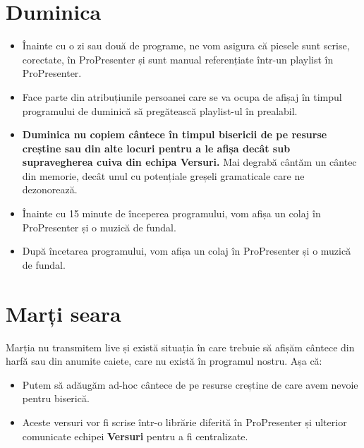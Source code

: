 \documentclass[epjST]{svjour}
\begin{document}
  \section{Duminica}
  \label{sec:3}
  \begin{itemize}
    \item Înainte cu o zi sau două de programe, ne vom asigura că piesele sunt
      scrise, corectate, în ProPresenter și sunt manual referențiate într-un
      playlist în ProPresenter.

    \item Face parte din atribuțiunile persoanei care se va ocupa de afișaj în timpul
      programului de duminică să pregătească playlist-ul în prealabil.

    \item \textbf{Duminica nu copiem cântece în timpul bisericii de pe resurse
      creștine sau din alte locuri pentru a le afișa decât sub supravegherea
      cuiva din echipa \textbf{Versuri}.} Mai degrabă cântăm un cântec din
      memorie, decât unul cu potențiale greșeli gramaticale care ne dezonorează.

    \item Înainte cu 15 minute de începerea programului, vom afișa un colaj în
      ProPresenter și o muzică de fundal.

    \item După încetarea programului, vom afișa un colaj în ProPresenter și o
      muzică de fundal.
  \end{itemize}

  \section{Marți seara}
  \label{sec:6} Marția nu transmitem live și există situația în care trebuie să
  afișăm cântece din harfă sau din anumite caiete, care nu există în programul nostru.
  Așa că:
  \begin{itemize}
    \item Putem să adăugăm ad-hoc cântece de pe resurse creștine de care avem nevoie
      pentru biserică.

    \item Aceste versuri vor fi scrise într-o librărie diferită în ProPresenter și
      ulterior comunicate echipei \textbf{Versuri} pentru a fi centralizate.
  \end{itemize}
\end{document}
